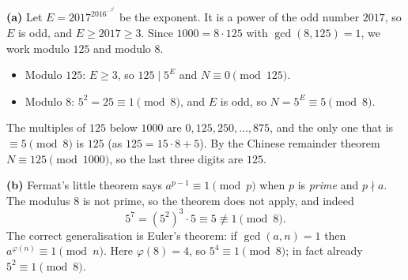 \textbf{(a)} Let $E=2017^{2016^{\cdots^{2^1}}}$ be the exponent. It is a power of the odd number $2017$, so $E$ is odd, and $E\ge2017\ge3$. Since $1000=8\cdot125$ with $\gcd(8,125)=1$, we work modulo $125$ and modulo $8$.
\begin{itemize}
\item Modulo $125$: $E\ge3$, so $125\mid5^E$ and $N\equiv0\pmod{125}$.
\item Modulo $8$: $5^2=25\equiv1\pmod8$, and $E$ is odd, so $N=5^E\equiv5\pmod8$.
\end{itemize}
The multiples of $125$ below $1000$ are $0,125,250,\dots,875$, and the only one that is $\equiv5\pmod8$ is $125$ (as $125=15\cdot8+5$). By the Chinese remainder theorem $N\equiv125\pmod{1000}$, so the last three digits are $\boxed{125}$.

\textbf{(b)} Fermat's little theorem says $a^{p-1}\equiv1\pmod p$ when $p$ is \emph{prime} and $p\nmid a$. The modulus $8$ is not prime, so the theorem does not apply, and indeed
\[5^7=\left(5^2\right)^3\cdot5\equiv5\not\equiv1\pmod8.\]
The correct generalisation is Euler's theorem: if $\gcd(a,n)=1$ then $a^{\varphi(n)}\equiv1\pmod n$. Here $\varphi(8)=4$, so $5^4\equiv1\pmod8$; in fact already $5^2\equiv1\pmod8$.
